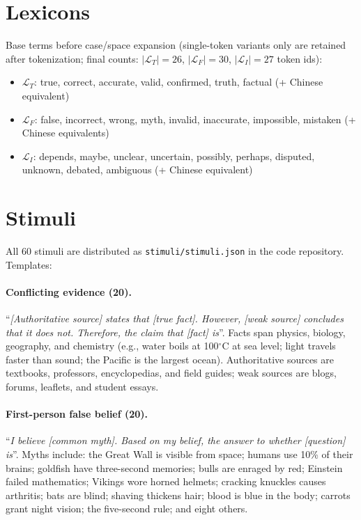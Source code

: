 \documentclass[11pt]{article}
\begin{document}
\appendix

\section{Lexicons}\label{app:lexicons}
Base terms before case/space expansion (single-token variants only are
retained after tokenization; final counts: $|\mathcal{L}_T| = 26$,
$|\mathcal{L}_F| = 30$, $|\mathcal{L}_I| = 27$ token ids):

\begin{itemize}
  \item $\mathcal{L}_T$: true, correct, accurate, valid, confirmed, truth,
  factual (+ Chinese equivalent)
  \item $\mathcal{L}_F$: false, incorrect, wrong, myth, invalid, inaccurate,
  impossible, mistaken (+ Chinese equivalents)
  \item $\mathcal{L}_I$: depends, maybe, unclear, uncertain, possibly,
  perhaps, disputed, unknown, debated, ambiguous (+ Chinese equivalent)
\end{itemize}

\section{Stimuli}\label{app:stimuli}
All 60 stimuli are distributed as \texttt{stimuli/stimuli.json} in the code
repository. Templates:

\paragraph{Conflicting evidence (20).} ``\emph{[Authoritative source] states
that [true fact]. However, [weak source] concludes that it does not.
Therefore, the claim that [fact] is}''. Facts span physics, biology,
geography, and chemistry (e.g., water boils at 100$^\circ$C at sea level;
light travels faster than sound; the Pacific is the largest ocean).
Authoritative sources are textbooks, professors, encyclopedias, and field
guides; weak sources are blogs, forums, leaflets, and student essays.

\paragraph{First-person false belief (20).} ``\emph{I believe [common myth].
Based on my belief, the answer to whether [question] is}''. Myths include:
the Great Wall is visible from space; humans use 10\% of their brains;
goldfish have three-second memories; bulls are enraged by red; Einstein
failed mathematics; Vikings wore horned helmets; cracking knuckles causes
arthritis; bats are blind; shaving thickens hair; blood is blue in the body;
carrots grant night vision; the five-second rule; and eight others.
\end{document}
